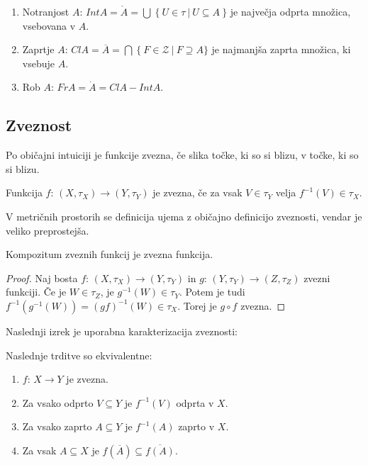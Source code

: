 \documentclass[11pt, a4paper]{article}
\begin{document}
    \begin{definition}
        \(\)\par
        \begin{enumerate}[label=\arabic*)]
            \item Notranjost \(A\): \(Int A = \mathring{A} = \bigcup\ \{\ U \in \tau\ |\ U \subseteq A\ \}\) je največja odprta množica, vsebovana v \(A\).
            \item Zaprtje \(A\): \(Cl A = \overline{A} = \bigcap\ \{\ F \in \mathscr{Z}\ |\ F \supseteq A \}\) je najmanjša zaprta množica, ki vsebuje \(A\).
            \item Rob \(A\): \(Fr A = \dot{A} = Cl A - Int A\).
        \end{enumerate}
    \end{definition}


    \subsection{Zveznost}

    Po običajni intuiciji je funkcije zvezna, če slika točke, ki so si blizu, v točke, ki so si blizu.

    \begin{definition}
        Funkcija \(f\): \((X,\tau_X) \to (Y,\tau_Y)\) je zvezna, če za vsak \(V \in \tau_Y\) velja \(f^{-1}(V) \in \tau_X\).
    \end{definition}

    V metričnih prostorih se definicija ujema z običajno definicijo zveznosti, vendar je veliko preprostejša.

    \begin{theorem}
        Kompozitum zveznih funkcij je zvezna funkcija.
    \end{theorem}

    \begin{proof}
        Naj bosta \(f\): \((X,\tau_X) \to (Y,\tau_Y)\) in \(g\): \((Y,\tau_Y) \to (Z,\tau_Z)\) zvezni funkciji. Če je \(W \in \tau_Z\), je \(g^{-1}(W) \in \tau_Y\). Potem je tudi \(f^{-1}(g^{-1}(W)) = (gf)^{-1}(W) \in \tau_X\). Torej je \(g \circ f\) zvezna.
    \end{proof}

    Naslednji izrek je uporabna karakterizacija zveznosti:
    \begin{theorem}
        Naslednje trditve so ekvivalentne:
        \begin{enumerate}[label=\arabic*)]
            \item \(f\): \(X \to Y\) je zvezna.
            \item Za vsako odprto \(V \subseteq Y\) je \(f^{-1}(V)\) odprta v \(X\).
            \item Za vsako zaprto \(A \subseteq Y\) je \(f^{-1}(A)\) zaprto v \(X\).
            \item Za vsak \(A \subseteq X\) je \(f(\overline{A}) \subseteq \overline{f(A)}\).
        \end{enumerate}
    \end{theorem}
\end{document}
